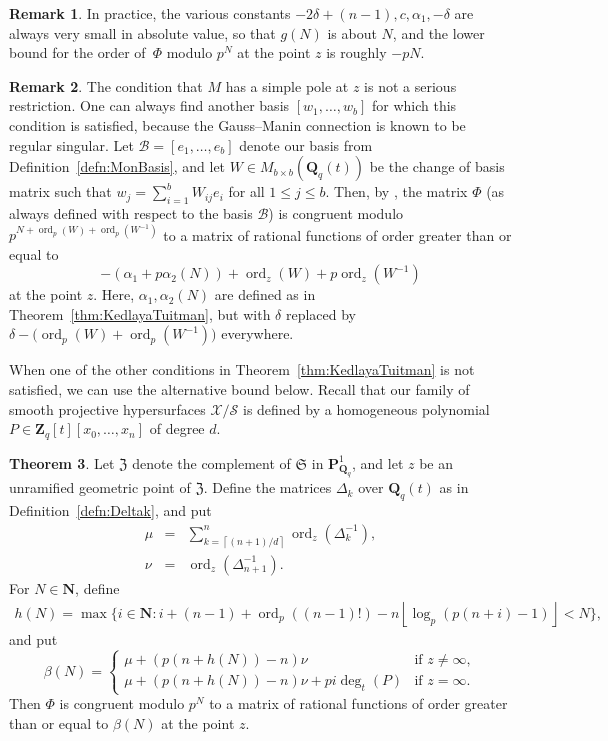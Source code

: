 \documentclass[a4paper,11pt]{article}
\numberwithin{equation}{section}
\providecommand{\floor}[1]{\left\lfloor#1\right\rfloor}   %
\providecommand{\ceil}[1]{\left\lceil#1\right\rceil}   %
\newcommand{\NN}{\mathbf{N}} %
\newcommand{\ZZ}{\mathbf{Z}} %
\newcommand{\QQ}{\mathbf{Q}} %
\DeclareMathOperator{\ord}{ord}          %
\providecommand{\cB}{\mathcal{B}} %
\theoremstyle{definition}
\newtheorem{thm}{Theorem}[section]
\newtheorem{rem}[thm]{Remark}
\begin{document}
\begin{rem}
In practice, the various constants $-2 \delta + (n-1), c, \alpha_1, -\delta$ 
are always very small in absolute value, so that $g(N)$ is about $N$, and 
the lower bound for the order of~$\Phi$ modulo $p^N$ at the point $z$ is 
roughly $-pN$.
\end{rem}

\begin{rem}
The condition that $M$ has a simple pole at $z$ is not a serious restriction. 
One can always find another basis $[w_1, \ldots, w_b]$ for which this condition is 
satisfied, because the Gauss--Manin connection is known to be regular singular. 
Let $\cB=[e_1,\ldots,e_b]$ denote our basis from Definition~\ref{defn:MonBasis},
and let $W \in M_{b \times b}(\QQ_q(t))$ 
be the change of basis matrix such that $w_j = \sum_{i=1}^b W_{ij} e_i$ for all 
$1 \leq j \leq b$. Then, by \citep[Corollary 2.6]{KedlayaTuitman2012}, the matrix 
$\Phi$ (as always defined with respect to the basis $\cB$) is congruent modulo 
$p^{N+\ord_p(W)+\ord_p(W^{-1})}$ 
to a matrix of rational functions of order greater than or equal to 
\[
-(\alpha_1+p \alpha_2(N))+\ord_z(W)+p\ord_z(W^{-1})
\]
at the point $z$. Here, $\alpha_1, \alpha_2(N)$ are defined as in 
Theorem~\ref{thm:KedlayaTuitman}, but with $\delta$ replaced by
$\delta-\bigl(\ord_p(W)+\ord_p(W^{-1})\bigr)$ everywhere.
\end{rem}

When one of the other conditions in Theorem~\ref{thm:KedlayaTuitman} is not satisfied,
we can use the alternative bound below. Recall that our family of smooth projective 
hypersurfaces $\mathcal{X}/\mathcal{S}$ is defined by a homogeneous polynomial 
$P \in \ZZ_q[t][x_0,\ldots,x_n]$ of degree $d$.

\begin{thm} \label{thm:Gerkmann}
Let $\mathfrak{Z}$ denote the complement of $\mathfrak{S}$ in 
$\mathbf{P}^{1}_{\mathbf{Q}_q}$, and let $z$ be an unramified geometric point 
of $\mathfrak{Z}$. Define the matrices $\Delta_k$ over $\QQ_q(t)$ as in 
Definition~\ref{defn:Deltak}, and put
\begin{eqnarray*}
\mu &=& \sum_{k=\ceil{(n+1)/d}}^n \ord_z(\Delta_k^{-1}), \\
\nu &=& \ord_z(\Delta_{n+1}^{-1}).
\end{eqnarray*}
For $N \in \NN$, define 
\begin{align*}
h(N) = \max \{ i \in \NN : i+(n-1)+\ord_p ((n-1)!)-n \floor{\log_p(p(n+i)-1)} < N \},
\end{align*}
and put
\[
\beta(N) = \begin{cases}
\mu +(p(n+h(N))-n) \nu & \mbox{if $z \neq \infty$}, \\
\mu +(p(n+h(N))-n) \nu + pi \deg_t(P) & \mbox{if $z = \infty$}.
\end{cases}
\]
Then $\Phi$ is congruent modulo $p^N$  to a matrix of rational functions of 
order greater than or equal to $\beta(N)$ at the point $z$.
\end{thm}
\end{document}
